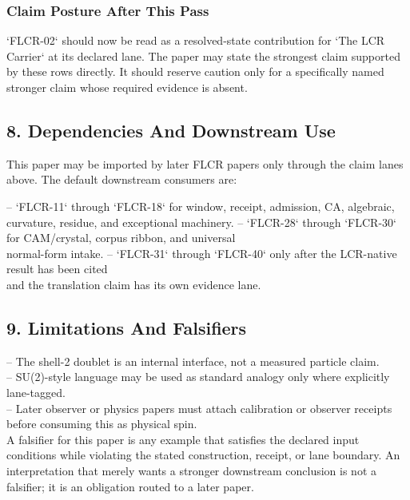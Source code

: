\documentclass[11pt]{article}
\begin{document}
\subsubsection*{Claim Posture After This Pass}

`FLCR-02` should now be read as a resolved-state contribution for `The LCR Carrier` at its declared lane. The paper may state the strongest claim supported by these rows directly. It should reserve caution only for a specifically named stronger claim whose required evidence is absent.

\subsection*{8. Dependencies And Downstream Use}

This paper may be imported by later FLCR papers only through the claim lanes
above. The default downstream consumers are:

\noindent{}-- `FLCR-11` through `FLCR-18` for window, receipt, admission, CA, algebraic,\\
  curvature, residue, and exceptional machinery.
\noindent{}-- `FLCR-28` through `FLCR-30` for CAM/crystal, corpus ribbon, and universal\\
  normal-form intake.
\noindent{}-- `FLCR-31` through `FLCR-40` only after the LCR-native result has been cited\\
  and the translation claim has its own evidence lane.

\subsection*{9. Limitations And Falsifiers}

\noindent{}-- The shell-2 doublet is an internal interface, not a measured particle claim.\\
\noindent{}-- SU(2)-style language may be used as standard analogy only where explicitly lane-tagged.\\
\noindent{}-- Later observer or physics papers must attach calibration or observer receipts before consuming this as physical spin.\\

A falsifier for this paper is any example that satisfies the declared input
conditions while violating the stated construction, receipt, or lane boundary.
An interpretation that merely wants a stronger downstream conclusion is not a
falsifier; it is an obligation routed to a later paper.
\end{document}
